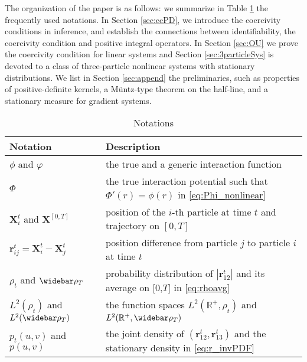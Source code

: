 \documentclass[]{elsarticle}
\def\R{\mathbb{R}}
\newcommand{\wbar}\widebar
\newcommand{\mbf}[1]{\boldsymbol{#1}}
\newcommand{\br}{\mbf{r}}
\newcommand{\bX}{\mbf{X}}
\numberwithin{equation}{section}
\numberwithin{theorem}{section}
\begin{document}
The organization of the paper is as follows: we summarize in Table \ref{tab:notation} the  frequently used notations.  In Section \ref{sec:ccPD}, we introduce the coercivity conditions in inference, and establish the connections between identifiability, the coercivity condition and positive integral operators.
In Section \ref{sec:OU} we prove the coercivity condition for linear systems and Section \ref{sec:3particleSys} is devoted to a class of three-particle nonlinear systems with stationary distributions. We list in Section \ref{sec:append} the preliminaries, such as properties of positive-definite kernels, a M\"untz-type theorem on the half-line, and a stationary measure for gradient systems. 
 \begin{table}[!h] 	\vspace{-1mm}
	\begin{center} 
		\caption{  Notations  } \label{tab:notation}	\vspace{-2mm}
		\begin{tabular}{ l  l }
		\toprule %
			Notation   &  Description \\  \hline
			$\phi$ and $\varphi$    &  the true and a generic interaction function       \\
			$\Phi$                          & the true interaction potential such that $\Phi'(r) = \phi(r)$ in \eqref{eq:Phi_nonlinear}\\
			$\bX^t_i$ and $\bX^{[0,T]}$    &  position of the $i$-th particle at time $t$ and trajectory on $[0,T]$       \\
	                $\br_{ij}^t= \bX^t_i-\bX^t_j $ & position difference from particle $j$ to particle $i$ at time $t$\\
	                $\rho_t$  and $\wbar\rho_T $ & probability distribution of $|\br_{12}^t|$ and its average on [0,$T$] in \eqref{eq:rhoavg}  \\
	                $L^2(\rho_t)$ and $L^2(\wbar \rho_T)$ & the function spaces $L^2(\R^+,\rho_t)$ and $L^2(\R^+,\wbar \rho_T)$  \\
	               	$p_t(u,v)$   and $p(u,v)$        & the joint density of $(\br_{12}^t, \br_{13}^t)$  and the stationary density in \eqref{eq:r_invPDF} \\ 
			\bottomrule	
		\end{tabular}  
	\end{center}
	\vspace{-3mm}
\end{table}
\end{document}
